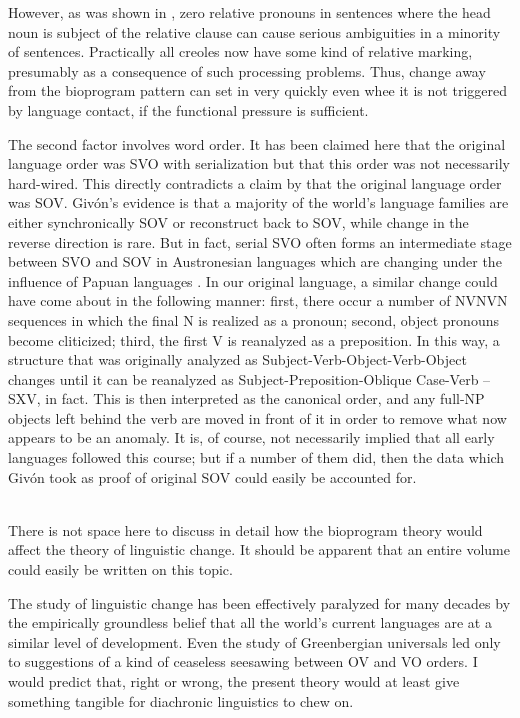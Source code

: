 However, as was shown in \citet{BeverEtAl1971}, zero relative pronouns in sentences where the head noun is subject of the relative clause can cause serious ambiguities in a minority of sentences. Practically all creoles now have some kind of relative marking, pre\-sumably as a consequence of such processing problems. Thus, change away from the bioprogram pattern can set in very quickly even whee it is not triggered by language contact, if the functional pressure is sufficient.

The second factor involves word order. It has been claimed here that the original language order was SVO with serialization but that this order was not necessarily hard-wired. This directly contradicts a claim by \citet[Chapter~7]{Givón1979} that the original language order was SOV. Givón's evidence is that a majority of the world's language families are either synchronically SOV or reconstruct back to SOV, while change in the reverse direction is rare. But in fact, serial SVO often forms an intermediate stage between SVO and SOV in Austro\-nesian languages which are changing under the influence of Papuan languages \citep{Bradshaw1979}. In our original language, a similar change could have come about in the following manner: first, there occur a number of NVNVN sequences in which the final N is realized as a pronoun; second, object pronouns become cliticized; third, the first V is reanalyzed as a preposition. In this way, a structure that was originally analyzed as Subject-Verb-Object-Verb-Object changes until it can be reanalyzed as Subject-Preposition-Oblique Case-Verb -- SXV, in fact. This is then interpreted as the canonical order, and any full-NP objects left behind the verb are moved in front of it in order to remove what now appears to be an anomaly. It is, of course, not necessarily implied that all early languages followed this course; but if a number of them did, then the data which Givón took as proof of original SOV could easily be accounted for.\\\\

There is not space here to discuss in detail how the bioprogram theory would affect the theory of linguistic change. It should be apparent that an entire volume could easily be written on this topic.

The study of linguistic change has been effectively paralyzed for many decades by the empirically groundless belief that all the world's current languages are at a similar level of development. Even the study of Greenbergian universals led only to suggestions of a kind of ceaseless seesawing between OV and VO orders. I would predict that, right or wrong, the present theory would at least give something tangible for diachronic linguistics to chew on.

